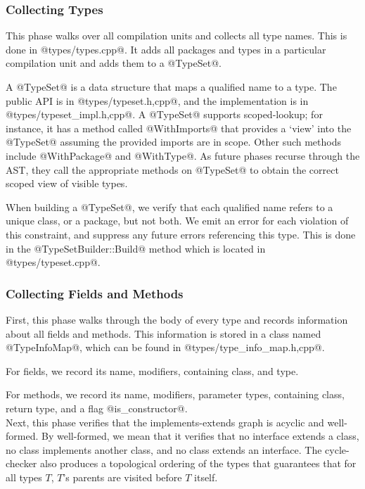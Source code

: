 \documentclass[12pt, titlepage]{article}
\begin{document}
\subsubsection{Collecting Types}\label{subsubsec:col-types}

This phase walks over all compilation units and collects all type names. This
is done in @types/types.cpp@. It adds all packages and types in a particular
compilation unit and adds them to a @TypeSet@.

A @TypeSet@ is a data structure that maps a qualified name to a type. The
public API is in @types/typeset.{h,cpp}@, and the implementation is in
@types/typeset_impl.{h,cpp}@. A @TypeSet@ supports scoped-lookup; for instance,
it has a method called @WithImports@ that provides a `view' into the @TypeSet@
assuming the provided imports are in scope. Other such methods include
@WithPackage@ and @WithType@. As future phases recurse through the AST, they
call the appropriate methods on @TypeSet@ to obtain the correct scoped view of
visible types.

When building a @TypeSet@, we verify that each qualified name refers to a
unique class, or a package, but not both. We emit an error for each violation
of this constraint, and suppress any future errors referencing this type. This
is done in the @TypeSetBuilder::Build@ method which is located in
@types/typeset.cpp@.

\subsubsection{Collecting Fields and Methods}\label{subsubsec:fields}

First, this phase walks through the body of every type and records information
about all fields and methods. This information is stored in a class named
@TypeInfoMap@, which can be found in @types/type_info_map.{h,cpp}@.

For fields, we record its name, modifiers, containing class, and type.

For methods, we record its name, modifiers, parameter types, containing class,
return type, and a flag @is_constructor@.\\

Next, this phase verifies that the implements-extends graph is acyclic and
well-formed. By well-formed, we mean that it verifies that no interface extends
a class, no class implements another class, and no class extends an interface.
The cycle-checker also produces a topological ordering of the types that
guarantees that for all types $T$, $T$'s parents are visited before $T$
itself.\\
\end{document}

